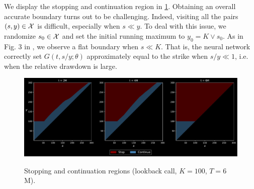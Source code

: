 We display the stopping and continuation region in \cref{fig:lkbkCall}. Obtaining an overall accurate boundary turns out to be challenging. Indeed,  visiting all the pairs $(s,y) \in \operatorname{\mathcal{X}}$ is difficult, especially when $s \ll y$. To deal with this issue, we randomize $s_0\in \operatorname{\mathcal{X}}$ and set the initial running maximum to $y_0 = K \vee s_0$. As in Fig. $3$ in \cite{DaiKwok}, we observe a flat boundary when $s\ll K$. That is, the neural network correctly set $G(t,s/y;\theta)$ approximately equal to the strike when $s/y \ll 1$, i.e. when the relative drawdown is large.  %

\begin{figure}[H]
    \centering
    \caption{Stopping and continuation regions (lookback call, $K=100$, $T=6$M).}
    \includegraphics[scale = 0.42]{Figures/Best Lookback Call, d = 1, N = 126, lbda = -0.23, no rdm.pdf}
    \label{fig:lkbkCall}
    
    \scriptsize{
\textit{
}}
\end{figure}

